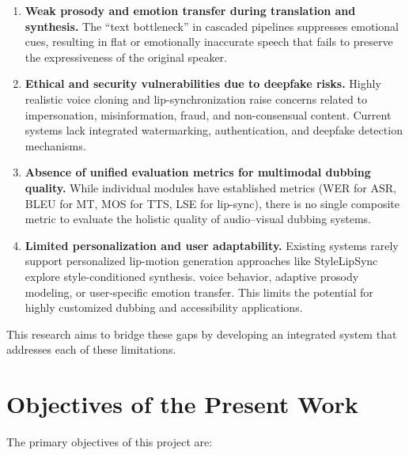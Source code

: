 \documentclass[12pt,oneside]{report}
\begin{document}
\begin{enumerate}
    \item \textbf{Weak prosody and emotion transfer during translation and synthesis.}  
    The ``text bottleneck'' in cascaded pipelines suppresses emotional cues, resulting in flat or emotionally inaccurate speech that fails to preserve the expressiveness of the original speaker.

    \item \textbf{Ethical and security vulnerabilities due to deepfake risks.}  
    Highly realistic voice cloning and lip-synchronization raise concerns related to impersonation, misinformation, fraud, and non-consensual content. Current systems lack integrated watermarking, authentication, and deepfake detection mechanisms.

    \item \textbf{Absence of unified evaluation metrics for multimodal dubbing quality.}  
    While individual modules have established metrics (WER for ASR, BLEU for MT, MOS for TTS, LSE for lip-sync), there is no single composite metric to evaluate the holistic quality of audio--visual dubbing systems.

    \item \textbf{Limited personalization and user adaptability.}  
    Existing systems rarely support personalized lip-motion generation approaches like StyleLipSync~\cite{kimin2023stylelipsync} explore style-conditioned synthesis. voice behavior, adaptive prosody modeling, or user-specific emotion transfer. This limits the potential for highly customized dubbing and accessibility applications.
\end{enumerate}


This research aims to bridge these gaps by developing an integrated system that addresses each of these limitations.

\section{Objectives of the Present Work}

The primary objectives of this project are:
\end{document}
